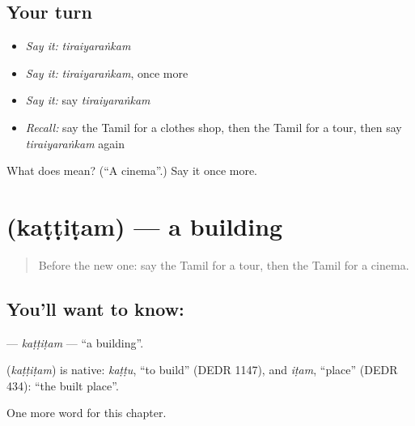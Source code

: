 \subsection*{Your turn}
\begin{itemize}
\raggedright
  \item \emph{Say it:} \emph{tiraiyaraṅkam}
  \item \emph{Say it:} \emph{tiraiyaraṅkam}, once more
  \item \emph{Say it:} say \emph{tiraiyaraṅkam}
  \item \emph{Recall:} say the Tamil for a clothes shop, then the Tamil for a tour, then say \emph{tiraiyaraṅkam} again
\end{itemize}

\begin{tcolorbox}[breakable,colback=teal!4,colframe=teal!35!black,title={Before you move on}]
What does  mean? (\textquotedblleft{}A cinema\textquotedblright{}.) Say it once more.
\end{tcolorbox}
\section[\texorpdfstring{\ta{கட்டிடம்} (kaṭṭiṭam)}{கட்டிடம் (kaṭṭiṭam)}]{ (kaṭṭiṭam) — a building}

\label{lesson:TA-C205-kattitam}



\begin{quote}
Before the new one: say the Tamil for a tour, then the Tamil for a cinema.
\end{quote}

\subsection*{You'll want to know: }
\textbf{} — \emph{kaṭṭiṭam} — \textquotedblleft{}a building\textquotedblright{}.

\begin{cousinweb}
\textbf{} (\emph{kaṭṭiṭam}) is native: \emph{kaṭṭu}, \textquotedblleft{}to build\textquotedblright{} (DEDR 1147), and \emph{iṭam}, \textquotedblleft{}place\textquotedblright{} (DEDR 434): \textquotedblleft{}the built place\textquotedblright{}.
\end{cousinweb}

\begin{grammarlens}[title={What you've built}]
One more word for this chapter.
\end{grammarlens}

